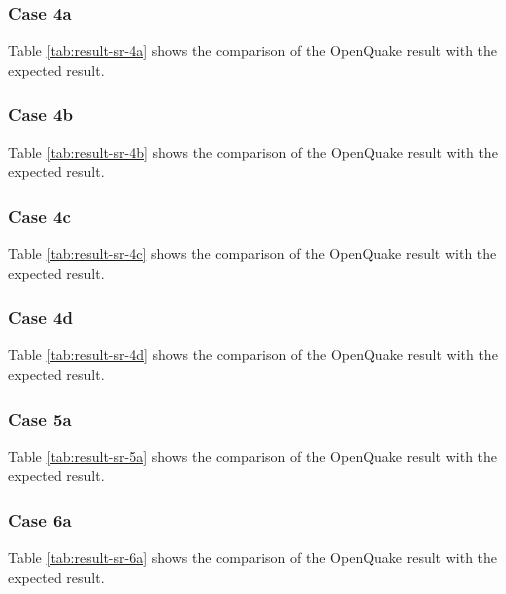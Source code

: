 \subsubsection{Case 4a}


Table \ref{tab:result-sr-4a} shows the comparison of the OpenQuake result with the expected result.

\subsubsection{Case 4b}


Table \ref{tab:result-sr-4b} shows the comparison of the OpenQuake result with the expected result.
\subsubsection{Case 4c}


Table \ref{tab:result-sr-4c} shows the comparison of the OpenQuake result with the expected result.

\subsubsection{Case 4d}


Table \ref{tab:result-sr-4d} shows the comparison of the OpenQuake result with the expected result.

\subsubsection{Case 5a}


Table \ref{tab:result-sr-5a} shows the comparison of the OpenQuake result with the expected result.

\subsubsection{Case 6a}


Table \ref{tab:result-sr-6a} shows the comparison of the OpenQuake result with the expected result.